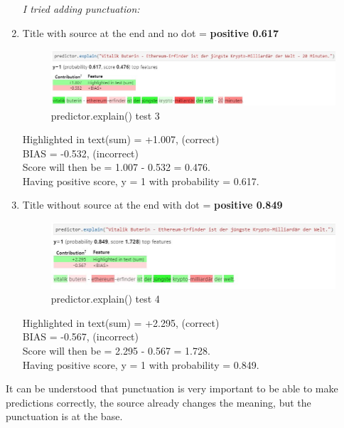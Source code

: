 \begin{enumerate}
\textit{I tried adding punctuation:}
  \item Title with source at the end and no dot = \textbf{positive 0.617}
      \begin{figure}[H]
\centering
\includegraphics[width=1\textwidth]{images/2text.jpg}
\caption{predictor.explain() test 3}
\label{fig:fig_003}
\end{figure}
\FloatBarrier
Highlighted in text(sum) = +1.007, (correct)\\
BIAS = -0.532, (incorrect)\\
Score will then be = 1.007 - 0.532 = 0.476.\\
Having positive score, y = 1 with probability = 0.617.
  \item Title without source at the end with dot = \textbf{positive 0.849}
      \begin{figure}[H]
\centering
\includegraphics[width=1\textwidth]{images/4text.jpg}
\caption{predictor.explain() test 4}
\label{fig:fig_004}
\end{figure}
\FloatBarrier
Highlighted in text(sum) = +2.295, (correct)\\
BIAS = -0.567, (incorrect)\\
Score will then be = 2.295 - 0.567 = 1.728.\\
Having positive score, y = 1 with probability = 0.849.
\end{enumerate}

It can be understood that punctuation is very important to be able to make predictions correctly, the source already changes the meaning, but the punctuation is at the base.

